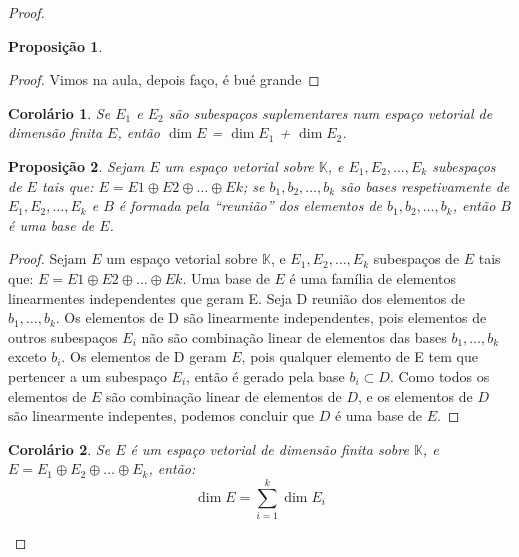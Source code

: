 \documentclass{article}
\newtheorem{corollary}{Corolário}[section]
\newtheorem{proposition}{Proposição}[section]
\begin{document}
\begin{proof}
\begin{proposition}
\end{proposition}

\begin{proof}
    Vimos na aula, depois faço, é bué grande
\end{proof}

\begin{corollary}
    Se $E_1$ e $E_2$ são subespaços suplementares num espaço vetorial de dimensão finita $E$,
então $\dim E$ = $\dim E_1$ + $\dim E_2$.

\end{corollary}

\begin{proposition}
    Sejam $E$ um espaço vetorial sobre $\mathbb{K}$, e $E_1, E_2,\dots, E_k$ subespaços de $E$ tais que: $E =
E1 \oplus E2 \oplus \dots \oplus Ek$; se $b_1, b_2,\dots, b_k$ são bases
respetivamente de $E_1, E_2,\dots, E_k$ e $B$ é formada pela “reunião” dos elementos de $b_1, b_2,\dots, b_k$,
então $B$ é uma base de $E$.

\end{proposition}
\begin{proof}
    Sejam $E$ um espaço vetorial sobre $\mathbb{K}$, e $E_1, E_2,\dots, E_k$ subespaços de $E$ tais que: $E =
E1 \oplus E2 \oplus \dots \oplus Ek$. Uma base de $E$ é uma família de elementos linearmentes independentes que geram E. Seja D reunião dos elementos de $b_1,\dots,b_k$. Os elementos de D são linearmente independentes, pois elementos de outros subespaços $E_i$ não são combinação linear de elementos das bases $b_1,\dots,b_k$ exceto $b_i$. Os elementos de D geram $E$, pois qualquer elemento de E tem que pertencer a um subespaço $E_i$, então é gerado pela base $b_i\subset D$. Como todos os elementos de  $E$ são combinação linear de elementos de $D$, e os elementos de  $D$ são linearmente indepentes, podemos concluir que  $D$ é uma base de $E$.
\end{proof}
\begin{corollary}
    Se $E$ é um espaço vetorial de dimensão finita sobre $\mathbb{K}$, e $E = E_1 \oplus E_2 \oplus \dots \oplus E_k$, então: $$\dim E = \sum^k_{i=1}\dim E_i$$

\end{corollary}


\end{proof}
\end{document}
